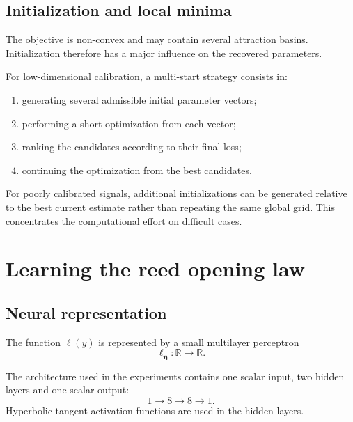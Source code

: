\documentclass[11pt,a4paper]{report}
\theoremstyle{plain}
\theoremstyle{definition}
\begin{document}
\subsection{Initialization and local minima}

The objective is non-convex and may contain several attraction basins.
Initialization therefore has a major influence on the recovered parameters.

For low-dimensional calibration, a multi-start strategy consists in:
\begin{enumerate}
    \item generating several admissible initial parameter vectors;
    \item performing a short optimization from each vector;
    \item ranking the candidates according to their final loss;
    \item continuing the optimization from the best candidates.
\end{enumerate}

For poorly calibrated signals, additional initializations can be generated
relative to the best current estimate rather than repeating the same global
grid. This concentrates the computational effort on difficult cases.


\section{Learning the reed opening law}
\label{sec:learning_reed_law}

\subsection{Neural representation}

The function \(\ell(y)\) is represented by a small multilayer perceptron
\begin{equation}
\ell_{\boldsymbol{\eta}}:
\mathbb{R}
\longrightarrow
\mathbb{R}.
\end{equation}

The architecture used in the experiments contains one scalar input, two hidden
layers and one scalar output:
\begin{equation}
1
\longrightarrow
8
\longrightarrow
8
\longrightarrow
1.
\label{eq:lfunc_architecture}
\end{equation}
Hyperbolic tangent activation functions are used in the hidden layers.
\end{document}
